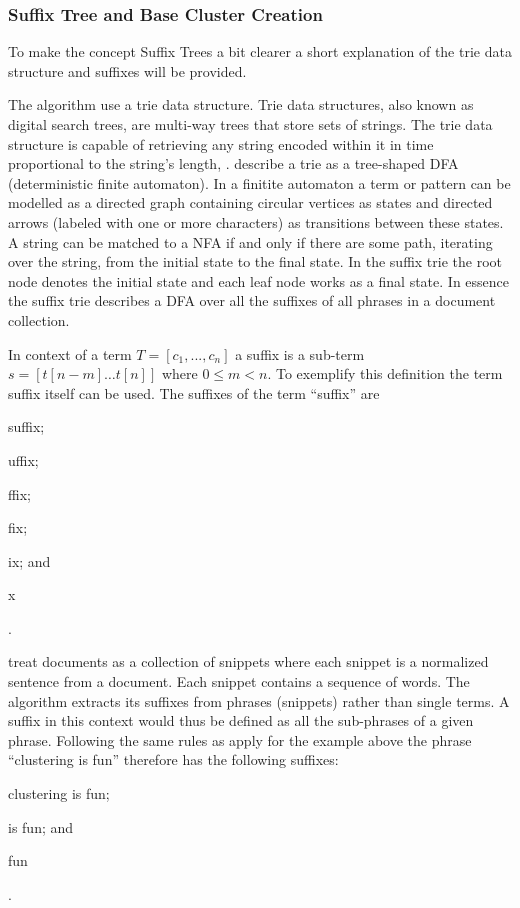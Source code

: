 \subsubsection{Suffix Tree and Base Cluster Creation}

To make the concept Suffix Trees a bit clearer a short explanation of the trie data structure and suffixes will be provided.

The \STC algorithm use a trie data structure. Trie data structures, also known as digital search trees, are multi-way trees that store sets of strings. The trie data structure is capable of retrieving any string encoded within it in time proportional to the string's length, \cite{Baeza-Yates2011c}. \textcite{Baeza-Yates2011c} describe a trie as a tree-shaped DFA (deterministic finite automaton). In a finitite automaton a term or pattern can be modelled as a directed graph containing circular vertices as states and directed arrows (labeled with one or more characters) as transitions between these states. A string can be matched to a NFA if and only if there are some path, iterating over the string, from the initial state to the final state. In the suffix trie the root node denotes the initial state and each leaf node works as a final state. In essence the suffix trie describes a DFA over all the suffixes of all phrases in a document collection.

In context of a term \(T = [c_{1}, ..., c_{n}]\) a suffix is a sub-term \(s = [t[n-m] \dots t[n]]\) where \(0 \le m < n\). To exemplify this definition the term suffix itself can be used. The suffixes of the term ``suffix'' are
\begin{inparaenum}[\itshape 1\upshape)]
\item suffix;
\item uffix;
\item ffix;
\item fix;
\item ix; and
\item x
\end{inparaenum}.

\cite{Oren1998} treat documents as a collection of snippets where each snippet is a normalized sentence from a document. Each snippet contains a sequence of words. The \STC algorithm extracts its suffixes from phrases (snippets) rather than single terms. A suffix in this context would thus be defined as all the sub-phrases of a given phrase. Following the same rules as apply for the example above the phrase ``clustering is fun'' therefore has the following suffixes:
\begin{inparaenum}[\itshape 1\upshape)]
\item clustering is fun;
\item is fun; and
\item fun
\end{inparaenum}.

